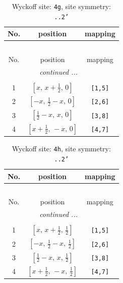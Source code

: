\documentclass[fleqn,8pt]{jsarticle}
\begin{document}
\renewcommand{\arraystretch}{1.2}
\begin{longtable}{ccc}
\caption{Wyckoff site: {\tt 4g}, site symmetry: {\tt ..2'}}
 \\
 \hline \hline
No. & position & mapping \\ \hline \endfirsthead

\multicolumn{2}{l}{\tablename\ \thetable{}} \\
 \hline \hline
No. & position & mapping \\ \hline \endhead

 \hline \hline
\multicolumn{2}{r}{\footnotesize\it continued ...} \\ \endfoot

 \hline \hline
\multicolumn{2}{r}{} \\ \endlastfoot

1 & $\left[ x,\, x + \frac{1}{2},\, 0 \right]$ & {\tt [1,5]} \\ \hline
2 & $\left[ - x,\, \frac{1}{2} - x,\, 0 \right]$ & {\tt [2,6]} \\ \hline
3 & $\left[ \frac{1}{2} - x,\, x,\, 0 \right]$ & {\tt [3,8]} \\ \hline
4 & $\left[ x + \frac{1}{2},\, - x,\, 0 \right]$ & {\tt [4,7]} \\
\end{longtable}
\renewcommand{\arraystretch}{1.2}
\begin{longtable}{ccc}
\caption{Wyckoff site: {\tt 4h}, site symmetry: {\tt ..2'}}
 \\
 \hline \hline
No. & position & mapping \\ \hline \endfirsthead

\multicolumn{2}{l}{\tablename\ \thetable{}} \\
 \hline \hline
No. & position & mapping \\ \hline \endhead

 \hline \hline
\multicolumn{2}{r}{\footnotesize\it continued ...} \\ \endfoot

 \hline \hline
\multicolumn{2}{r}{} \\ \endlastfoot

1 & $\left[ x,\, x + \frac{1}{2},\, \frac{1}{2} \right]$ & {\tt [1,5]} \\ \hline
2 & $\left[ - x,\, \frac{1}{2} - x,\, \frac{1}{2} \right]$ & {\tt [2,6]} \\ \hline
3 & $\left[ \frac{1}{2} - x,\, x,\, \frac{1}{2} \right]$ & {\tt [3,8]} \\ \hline
4 & $\left[ x + \frac{1}{2},\, - x,\, \frac{1}{2} \right]$ & {\tt [4,7]} \\
\end{longtable}
\end{document}
